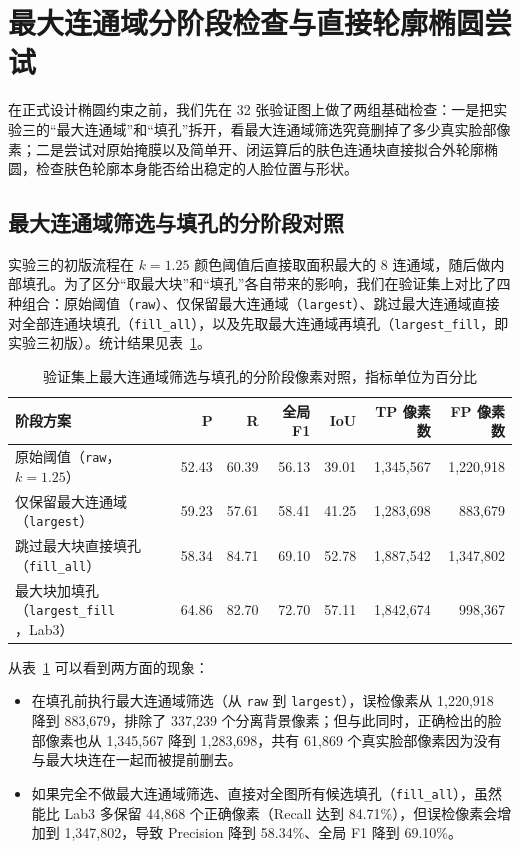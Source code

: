 \section{最大连通域分阶段检查与直接轮廓椭圆尝试}\label{sec:cc_ellipse}

在正式设计椭圆约束之前，我们先在 32 张验证图上做了两组基础检查：一是把实验三的“最大连通域”和“填孔”拆开，看最大连通域筛选究竟删掉了多少真实脸部像素；二是尝试对原始掩膜以及简单开、闭运算后的肤色连通块直接拟合外轮廓椭圆，检查肤色轮廓本身能否给出稳定的人脸位置与形状。

\subsection{最大连通域筛选与填孔的分阶段对照}

实验三的初版流程在 $k=1.25$ 颜色阈值后直接取面积最大的 8 连通域，随后做内部填孔。为了区分“取最大块”和“填孔”各自带来的影响，我们在验证集上对比了四种组合：原始阈值（\texttt{raw}）、仅保留最大连通域（\texttt{largest}）、跳过最大连通域直接对全部连通块填孔（\texttt{fill\_all}），以及先取最大连通域再填孔（\texttt{largest\_fill}，即实验三初版）。统计结果见表~\ref{tab:lab4_cc}。

\begin{table}[H]
\centering\footnotesize
\setlength{\tabcolsep}{4pt}
\caption{验证集上最大连通域筛选与填孔的分阶段像素对照，指标单位为百分比}\label{tab:lab4_cc}
\begin{tabular}{lrrrrrr}
\toprule
阶段方案 & P & R & 全局 F1 & IoU & TP 像素数 & FP 像素数 \\
\midrule
原始阈值（\texttt{raw}，$k=1.25$） & 52.43 & 60.39 & 56.13 & 39.01 & 1,345,567 & 1,220,918 \\
仅保留最大连通域（\texttt{largest}） & 59.23 & 57.61 & 58.41 & 41.25 & 1,283,698 & 883,679 \\
跳过最大块直接填孔（\texttt{fill\_all}） & 58.34 & 84.71 & 69.10 & 52.78 & 1,887,542 & 1,347,802 \\
最大块加填孔（\texttt{largest\_fill}，Lab3） & 64.86 & 82.70 & 72.70 & 57.11 & 1,842,674 & 998,367 \\
\bottomrule
\end{tabular}
\end{table}

从表~\ref{tab:lab4_cc} 可以看到两方面的现象：
\begin{itemize}
\item 在填孔前执行最大连通域筛选（从 \texttt{raw} 到 \texttt{largest}），误检像素从 1,220,918 降到 883,679，排除了 337,239 个分离背景像素；但与此同时，正确检出的脸部像素也从 1,345,567 降到 1,283,698，共有 61,869 个真实脸部像素因为没有与最大块连在一起而被提前删去。
\item 如果完全不做最大连通域筛选、直接对全图所有候选填孔（\texttt{fill\_all}），虽然能比 Lab3 多保留 44,868 个正确像素（Recall 达到 84.71\%），但误检像素会增加到 1,347,802，导致 Precision 降到 58.34\%、全局 F1 降到 69.10\%。
\end{itemize}

